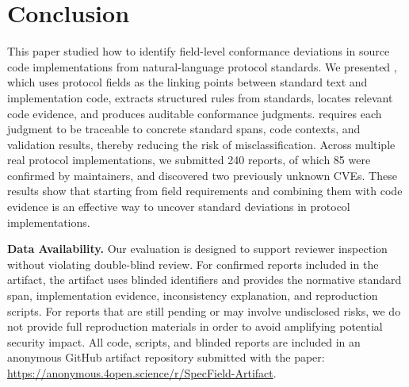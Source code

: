 \section{Conclusion}
\label{sec:conclusion}

This paper studied how to identify field-level conformance deviations in source
code implementations from natural-language protocol standards. We presented
\tool{}, which uses protocol fields as the linking points between standard text
and implementation code, extracts structured rules from standards, locates
relevant code evidence, and produces auditable conformance judgments. \tool{}
requires each judgment to be traceable to concrete standard spans, code
contexts, and validation results, thereby reducing the risk of misclassification.
Across multiple real protocol implementations, we submitted 240 reports, of
which 85 were confirmed by maintainers, and discovered two previously
unknown CVEs. These results show that starting from field requirements and
combining them with code evidence is an effective way to uncover standard
deviations in protocol implementations.



\noindent \textbf{Data Availability.}
Our evaluation is designed to support reviewer inspection without violating
double-blind review. For confirmed reports included in the artifact, the
artifact uses blinded identifiers and provides the normative
standard span, implementation evidence, inconsistency explanation, and
reproduction scripts. For reports that are still pending or may involve
undisclosed risks, we do not provide full reproduction materials in order to
avoid amplifying potential security impact. All code, scripts, and blinded
reports are included in an anonymous GitHub artifact repository submitted with
the paper:
\url{https://anonymous.4open.science/r/SpecField-Artifact}.
